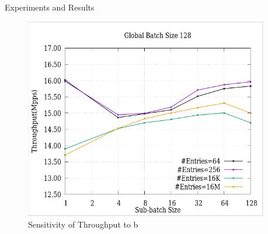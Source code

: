\documentclass[final]{beamer}
\newlength{\sepwid}
\newlength{\twocolwid}
\begin{document}
\begin{frame}
\begin{columns}[t]
\begin{column}{\twocolwid}
\begin{columns}[t,totalwidth=\twocolwid]
\begin{column}{\twocolwid}
\begin{exampleblock}{Experiments and Results}
\begin{multicols}{3}
\begin{figure}
\includegraphics[width=1\linewidth]{img/throughput_sensitivity_b}
\caption{Sensitivity of Throughput to b}
\end{figure}

\end{multicols}
\end{exampleblock}


\end{column} %
\begin{column}{\sepwid}\end{column} %


\end{columns}
\end{column}
\end{columns}
\end{frame}
\end{document}

